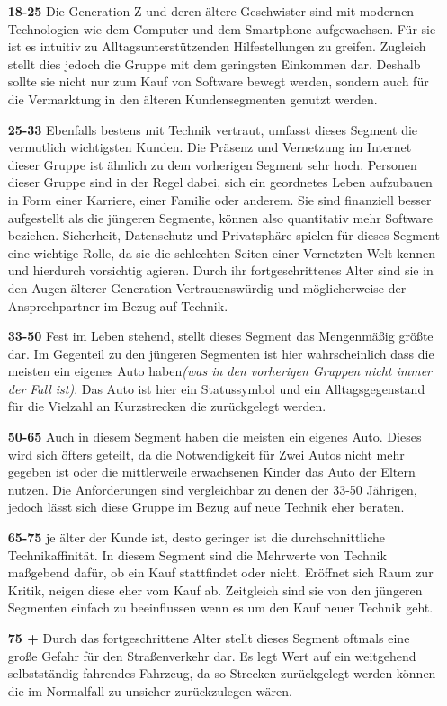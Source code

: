 \begin{itemize}
	\item[\textbf{18-25}] 
	Die Generation Z und deren ältere Geschwister sind mit modernen Technologien wie dem Computer und dem Smartphone aufgewachsen. Für sie ist es intuitiv zu Alltagsunterstützenden Hilfestellungen zu greifen. Zugleich stellt dies jedoch die Gruppe mit dem geringsten Einkommen dar. Deshalb sollte sie nicht nur zum Kauf von Software bewegt werden, sondern auch für die Vermarktung in den älteren Kundensegmenten genutzt werden.
	\item[\textbf{25-33}]
	Ebenfalls bestens mit Technik vertraut, umfasst dieses Segment die vermutlich wichtigsten Kunden. Die Präsenz und Vernetzung im Internet dieser Gruppe ist ähnlich zu dem vorherigen Segment sehr hoch. Personen dieser Gruppe sind in der Regel dabei, sich ein geordnetes Leben aufzubauen in Form einer Karriere, einer Familie oder anderem. Sie sind finanziell besser aufgestellt als die jüngeren Segmente, können also quantitativ mehr Software beziehen. Sicherheit, Datenschutz und Privatsphäre spielen für dieses Segment eine wichtige Rolle, da sie die schlechten Seiten einer Vernetzten Welt kennen und hierdurch vorsichtig agieren. Durch ihr fortgeschrittenes Alter sind sie in den Augen älterer Generation Vertrauenswürdig und möglicherweise der Ansprechpartner im Bezug auf Technik.
	\item[\textbf{33-50}]
	Fest im Leben stehend, stellt dieses Segment das Mengenmäßig größte dar. Im Gegenteil zu den jüngeren Segmenten ist hier wahrscheinlich dass die meisten ein eigenes Auto haben\textit{(was in den vorherigen Gruppen nicht immer der Fall ist)}. Das Auto ist hier ein Statussymbol und ein Alltagsgegenstand für die Vielzahl an Kurzstrecken die zurückgelegt werden. 
	\item[\textbf{50-65}]
	Auch in diesem Segment haben die meisten ein eigenes Auto. Dieses wird sich öfters geteilt, da die Notwendigkeit für Zwei Autos nicht mehr gegeben ist oder die mittlerweile erwachsenen Kinder das Auto der Eltern nutzen. Die Anforderungen sind vergleichbar zu denen der 33-50 Jährigen, jedoch lässt sich diese Gruppe im Bezug auf neue Technik eher beraten.
	\item[\textbf{65-75}]
	je älter der Kunde ist, desto geringer ist die durchschnittliche Technikaffinität. In diesem Segment sind die Mehrwerte von Technik maßgebend dafür, ob ein Kauf stattfindet oder nicht. Eröffnet sich Raum zur Kritik, neigen diese eher vom Kauf ab. Zeitgleich sind sie von den jüngeren Segmenten einfach zu beeinflussen wenn es um den Kauf neuer Technik geht. 
	\item[\textbf{75 +}]
	Durch das fortgeschrittene Alter stellt dieses Segment oftmals eine große Gefahr für den Straßenverkehr dar. Es legt Wert auf ein weitgehend selbstständig fahrendes Fahrzeug, da so Strecken zurückgelegt werden können die im Normalfall zu unsicher zurückzulegen wären. 
\end{itemize}
